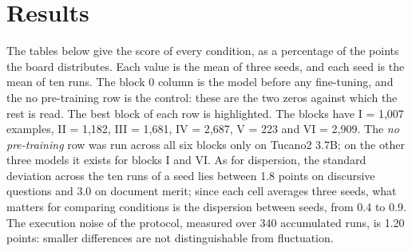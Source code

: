 \documentclass{IOS-Book-Article}
\begin{document}
\section{Results}
The tables below give the score of every condition, as a percentage of the points the board distributes. Each value is the mean of three seeds, and each seed is the mean of ten runs. The block 0 column is the model before any fine-tuning, and the no pre-training row is the control: these are the two zeros against which the rest is read. The best block of each row is highlighted. The blocks have I = 1,007 examples, II = 1,182, III = 1,681, IV = 2,687, V = 223 and VI = 2,909. The \emph{no pre-training} row was run across all six blocks only on Tucano2 3.7B; on the other three models it exists for blocks I and VI.
As for dispersion, the standard deviation across the ten runs of a seed lies between 1.8 points on discursive questions and 3.0 on document merit; since each cell averages three seeds, what matters for comparing conditions is the dispersion between seeds, from 0.4 to 0.9. The execution noise of the protocol, measured over 340 accumulated runs, is 1.20 points: smaller differences are not distinguishable from fluctuation.
\end{document}
